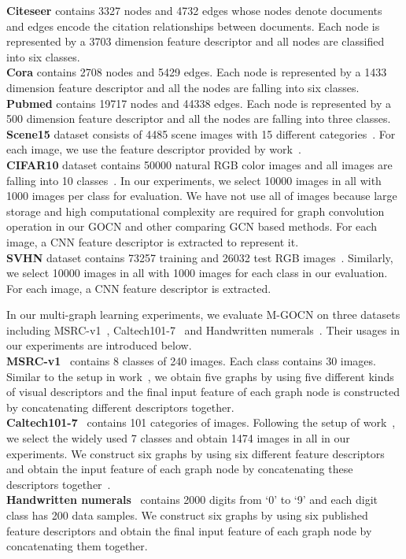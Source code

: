 \documentclass{article}
\begin{document}
\noindent\textbf{Citeseer} contains 3327 nodes and 4732 edges whose nodes denote documents and edges encode the citation relationships between
documents.
Each node is represented by a 3703 dimension feature descriptor and all nodes are classified into six classes.
\\
\noindent\textbf{Cora} contains 2708 nodes and 5429 edges.
Each node is represented by a 1433 dimension feature descriptor and all the nodes are falling into six classes. \\
\noindent\textbf{Pubmed} contains 19717 nodes and 44338 edges.
Each node is represented by a 500 dimension feature descriptor and
all the nodes are falling into three classes.
\\
\noindent\textbf{Scene15} dataset consists of 4485 scene images with 15 different categories~\cite{jiang2013label}.
For each image, we use the feature descriptor provided by work~\cite{jiang2013label}.
\\
\noindent\textbf{CIFAR10} dataset  contains  50000 natural RGB color images and all images are falling into 10 classes~\cite{krizhevsky2009learning}.
In our experiments, we select 10000 images in all with 1000 images per class for
 evaluation.
We have not use all of images because large storage and high computational complexity are required for graph convolution operation in our GOCN and other comparing GCN based methods.
For each image, a CNN feature descriptor is extracted to represent it.
\\
\noindent\textbf{SVHN} dataset contains 73257 training and 26032 test RGB images~\cite{netzer2011reading}.
Similarly, we select 10000 images in all with 1000 images for each class in our evaluation.
For each image, a CNN feature descriptor is extracted.

In our multi-graph learning experiments, we evaluate M-GOCN on three datasets including MSRC-v1~\cite{winn2005locus}, Caltech101-7~\cite{li2015large,nie2016parameter} and Handwritten numerals~\cite{AsuncionNewman2007}.
Their usages in our experiments are introduced below.
\\
\noindent\textbf{MSRC-v1}~\cite{winn2005locus} contains 8 classes of 240 images.
Each class contains 30 images.
Similar to the setup in work~\cite{nie2016parameter},
we obtain five graphs by using five different kinds of visual descriptors and
the final input feature of each graph node is constructed by  concatenating different descriptors together. \\
\noindent\textbf{Caltech101-7}~\cite{li2015large} contains 101 categories of images. Following the setup of work~\cite{nie2017multi}, we select the widely used 7 classes  and obtain 1474 images in all in our experiments.
We construct six graphs  by using six different feature descriptors and obtain the input feature of each graph node by concatenating these
descriptors together~\cite{nie2017multi}.
\\
\noindent\textbf{Handwritten numerals}~\cite{AsuncionNewman2007} contains 2000 digits from `0' to `9' and each  digit class has 200 data samples.
We construct six graphs by using six published feature descriptors and obtain the final input feature of each graph node by concatenating them together.
\end{document}
